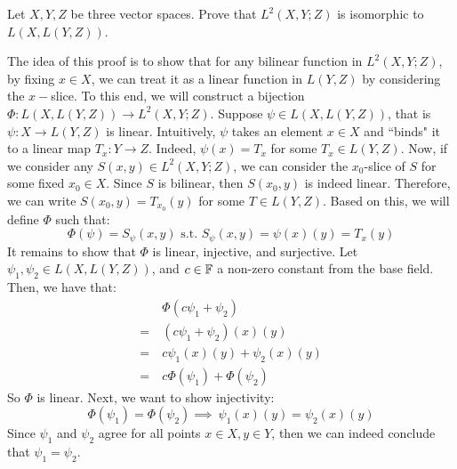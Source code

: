 \documentclass{article}
\begin{document}
\newpage
{}

\begin{qu}
    Let $ X, Y, Z $ be three vector spaces.
    Prove that $ L^{2}(X, Y ; Z) $ is isomorphic to $ L(X, L(Y, Z)) $.
\end{qu}

\begin{soln}
    The idea of this proof is to show that for any bilinear function in $ L^{2}(X, Y; Z) $, by fixing $ x \in X $, we can treat it as a linear function in $ L(Y, Z) $ by considering the $ x- $slice.
    To this end, we will construct a bijection $ \Phi : L(X, L(Y, Z)) \rightarrow L^{2}(X, Y ; Z) $. \vsp
    Suppose $ \psi \in L(X, L(Y, Z)) $, that is $ \psi : X \rightarrow L(Y, Z) $ is linear.
    Intuitively, $ \psi $ takes an element $ x \in X $ and ``binds" it to a linear map $ T_{x}: Y \rightarrow Z $.
    Indeed, $ \psi(x) = T_{x} $ for some $ T_{x} \in L(Y, Z) $. \vsp
    Now, if we consider any $ S(x, y) \in L^{2}(X, Y ; Z) $, we can consider the $ x_{0} $-slice of $ S $ for some fixed $ x_{0} \in X $. 
    Since $ S $ is bilinear, then $ S(x_{0}, y) $ is indeed linear.
    Therefore, we can write $ S(x_{0}, y) = T_{x_{0}}(y) $ for some $ T \in L(Y, Z) $. \vsp
    Based on this, we will define $ \Phi $ such that:
    \begin{equation*}
        \Phi(\psi) = S_{\psi}(x, y) \textrm{ s.t. } S_{\psi}(x, y) = \psi(x)(y) = T_{x}(y)
    \end{equation*}
    It remains to show that $ \Phi $ is linear, injective, and surjective. \vsp
    Let $ \psi_{1}, \psi_{2} \in L(X, L(Y, Z)) $, and $ c \in \mathbb{F} $ a non-zero constant from the base field. \\
    Then, we have that:
    \begin{align*}
        & \Phi(c\psi_{1} + \psi_{2}) \\
        = \ & (c\psi_{1} + \psi_{2})(x)(y) \\
        = \ & c\psi_{1}(x)(y) + \psi_{2}(x)(y) \\
        = \ & c\Phi(\psi_{1}) + \Phi(\psi_{2})
    \end{align*}
    So $ \Phi $ is linear. Next, we want to show injectivity:
    \begin{equation*}
        \Phi(\psi_{1}) = \Phi(\psi_{2}) \implies \ \psi_{1}(x)(y) = \psi_{2}(x)(y)
    \end{equation*}
    Since $ \psi_{1} $ and $ \psi_{2} $ agree for all points $ x \in X, y \in Y $,
    then we can indeed conclude that $ \psi_{1} = \psi_{2} $.

\end{soln}
\end{document}
